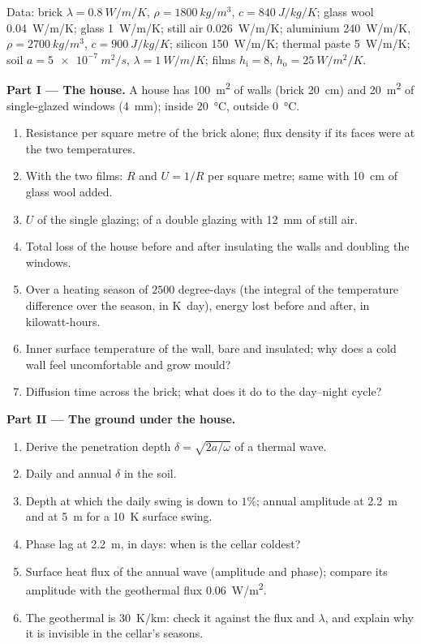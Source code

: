\begin{problem}\label{pb:b2:heat-conduction:1}
Data: brick $\lambda = \qty{0.8}{W/m/K}$, $\rho = \qty{1800}{kg/m^3}$, $c =
\qty{840}{J/kg/K}$; glass wool \qty{0.04}{W/m/K}; glass \qty{1}{W/m/K}; still
air \qty{0.026}{W/m/K}; aluminium \qty{240}{W/m/K}, $\rho = \qty{2700}{kg/m^3}$,
$c = \qty{900}{J/kg/K}$; silicon \qty{150}{W/m/K}; thermal paste
\qty{5}{W/m/K}; soil $a = \qty{5e-7}{m^2/s}$, $\lambda = \qty{1}{W/m/K}$;
films $h_{\text{i}} = 8$, $h_{\text{o}} = \qty{25}{W/m^2/K}$.

\textbf{Part I --- The house.}
A house has \qty{100}{m^2} of walls (brick \qty{20}{cm}) and \qty{20}{m^2}
of single-glazed windows (\qty{4}{mm}); inside \qty{20}{\celsius},
outside \qty{0}{\celsius}.
\begin{enumerate}
  \item Resistance per square metre of the brick alone; flux density
        if its faces were at the two temperatures.
  \item With the two films: $R$ and $U = 1/R$ per square metre; same
        with \qty{10}{cm} of glass wool added.
  \item $U$ of the single glazing; of a double glazing with \qty{12}{mm}
        of still air.
  \item Total loss of the house before and after insulating the walls
        and doubling the windows.
  \item Over a heating season of $2500$ degree-days (the integral of
        the temperature difference over the season, in \unit{K.day}),
        energy lost before and after, in kilowatt-hours.
  \item Inner surface temperature of the wall, bare and insulated;
        why does a cold wall feel uncomfortable and grow mould?
  \item Diffusion time across the brick; what does it do to the
        day--night cycle?
\end{enumerate}

\textbf{Part II --- The ground under the house.}
\begin{enumerate}[resume]
  \item Derive the penetration depth $\delta = \sqrt{2a/\omega}$ of a
        thermal wave.
  \item Daily and annual $\delta$ in the soil.
  \item Depth at which the daily swing is down to $1\%$; annual
        amplitude at \qty{2.2}{m} and at \qty{5}{m} for a \qty{10}{K}
        surface swing.
  \item Phase lag at \qty{2.2}{m}, in days: when is the cellar coldest?
  \item Surface heat flux of the annual wave (amplitude and phase);
        compare its amplitude with the geothermal flux \qty{0.06}{W/m^2}.
  \item The geothermal  is \qty{30}{K/km}: check it against the
        flux and $\lambda$, and explain why it is invisible in the
        cellar's seasons.
\end{enumerate}


\end{problem}
